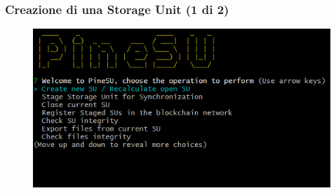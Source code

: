 \documentclass{beamer}
\begin{document}

\begin{frame}
	\frametitle{Creazione di una Storage Unit (1 di 2)}
	\begin{figure}
		\includegraphics[width=\textwidth]{figures/ops/1.png}
	\end{figure}
\end{frame}
\end{document}
